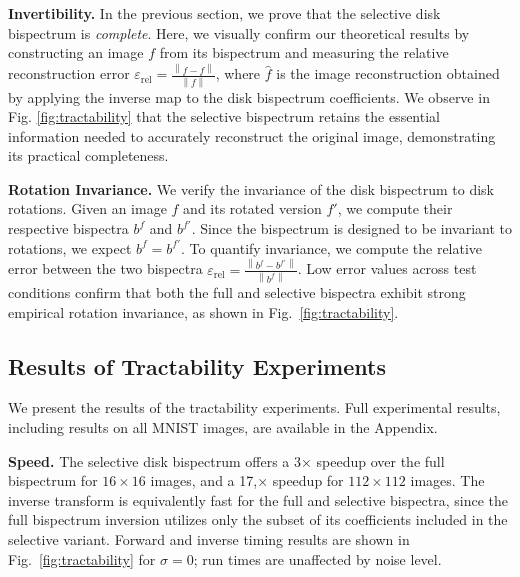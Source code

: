 \textbf{Invertibility.} In the previous section, we prove that the selective disk bispectrum is \textit{complete}. Here, we visually confirm our theoretical results by constructing an image \( f \) from its bispectrum and measuring the relative reconstruction error $\varepsilon_{\text{rel}} = \frac{\left\lVert \hat{f} - f \right\rVert}{\left\lVert f \right\rVert}$, where \( \hat{f} \) is the image reconstruction obtained by applying the inverse map to the disk bispectrum coefficients. We observe in Fig. \ref{fig:tractability} that the selective bispectrum retains the essential information needed to accurately reconstruct the original image, demonstrating its practical completeness.


\textbf{Rotation Invariance.} We verify the invariance of the disk bispectrum to disk rotations. Given an image \( f \) and its rotated version \( f' \), we compute their respective bispectra \( b^{f} \) and \( b^{f'} \). Since the bispectrum is designed to be invariant to rotations, we expect $b^{f} = b^{f'}$. To quantify invariance, we compute the relative error between the two bispectra $\varepsilon_{\text{rel}} = \frac{\left\lVert b^{f} - b^{f'} \right\rVert}{\left\lVert b^{f} \right\rVert}$. Low error values across test conditions confirm that both the full and selective bispectra exhibit strong empirical rotation invariance, as shown in Fig.~\ref{fig:tractability}.

\subsection{Results of Tractability Experiments}

We present the results of the tractability experiments. Full experimental results, including results on all MNIST images, are available in the Appendix.

\textbf{Speed.} The selective disk bispectrum offers a 3× speedup over the full bispectrum for \(16 \times 16\) images, and a 17,× speedup for \(112 \times 112\) images. The inverse transform is equivalently fast for the full and selective bispectra, since the full bispectrum inversion utilizes only the subset of its coefficients included in the selective variant. Forward and inverse timing results are shown in Fig.~\ref{fig:tractability} for \(\sigma = 0\); run times are unaffected by noise level.

